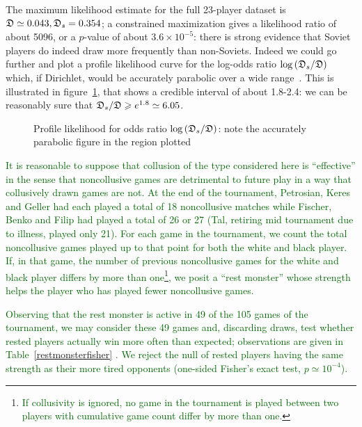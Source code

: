 \documentclass[review]{elsarticle}
\begin{document}
The maximum likelihood estimate for the full 23-player dataset is
$\mathfrak{D}\simeq 0.043, \mathfrak{D}_s=0.354$; a constrained maximization gives a
likelihood ratio of about 5096, or a $p$-value of about $3.6\times
10^{-5}$: there is strong evidence that Soviet players do indeed draw
more frequently than non-Soviets.  Indeed we could go further and plot
a profile likelihood curve for the log-odds ratio
$\log\left(\mathfrak{D}_s/\mathfrak{D}\right)$ which, if Dirichlet, would be
accurately parabolic over a wide range~\cite[page 343]{ohagan2004}.
This is illustrated in figure~\ref{proflike}, that shows a credible
interval of about 1.8-2.4: we can be reasonably sure that
$\mathfrak{D}_s/\mathfrak{D}\geqslant e^{1.8}\simeq 6.05$.


\begin{figure}[htbp]
\begin{center}
\caption{Profile likelihood \label{proflike} for odds ratio
  $\log\left(\mathfrak{D}_s/\mathfrak{D}\right)$: note the accurately parabolic figure in
  the region plotted}
  \end{center}
\end{figure}


\textcolor{DarkGreen}{It is reasonable to suppose that collusion of
  the type considered here is ``effective'' in the sense that
  noncollusive games are detrimental to future play in a way that
  collusively drawn games are not.  At the end of the tournament,
  Petrosian, Keres and Geller had each played a total of 18
  noncollusive matches while Fischer, Benko and Filip had played a
  total of 26 or 27 (Tal, retiring mid tournament due to illness,
  played only 21).  For each game in the tournament, we count the
  total noncollusive games played up to that point for both the white
  and black player.  If, in that game, the number of previous
  noncollusive games for the white and black player differs by more
  than one\footnote{\textcolor{DarkGreen}{If collusivity is ignored,
    no game in the tournament is played between two players with
    cumulative game count differ by more than one.}}, we posit a ``rest
  monster'' whose strength helps the player who has played fewer
  noncollusive games.}

\textcolor{DarkGreen}{
  Observing that the rest monster is
  active in 49 of the 105 games of the tournament, we may consider
  these 49 games and, discarding draws, test whether rested players
  actually win more often than expected; observations are given in
  Table~\ref{restmonsterfisher} .  We reject the null of rested
  players having the same strength as their more tired opponents
  (one-sided Fisher's exact test, $p\simeq 10^{-4}$).}
\end{document}
